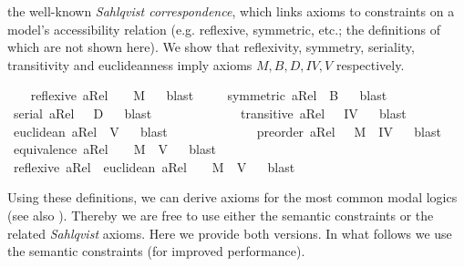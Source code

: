 \begin{isabellebody}
\begin{isamarkuptext}
  the well-known \emph{Sahlqvist correspondence}, which links axioms to constraints on a model's accessibility
  relation (e.g. reflexive, symmetric, etc.; the definitions of which are not shown here). We show
  that  reflexivity, symmetry, seriality, transitivity and euclideanness imply
  axioms $M, B, D, IV, V$ respectively.%
\end{isamarkuptext}\isamarkuptrue%
\ \ \isamarkupfalse%
\ {\isachardoublequoteopen}reflexive\ aRel\ \ {\isasymLongrightarrow}\ \ {\isasymlfloor}M{\isasymrfloor}{\isachardoublequoteclose}%
\ %
%
\isamarkupfalse%
\ blast\ %
%
%
%
\isanewline
\ \ \isamarkupfalse%
\ {\isachardoublequoteopen}symmetric\ aRel\ {\isasymLongrightarrow}\ {\isasymlfloor}B{\isasymrfloor}{\isachardoublequoteclose}%
\ %
%
\isamarkupfalse%
\ blast%
%
%
\isanewline
\ \ \isamarkupfalse%
\ {\isachardoublequoteopen}serial\ aRel\ \ {\isasymLongrightarrow}\ {\isasymlfloor}D{\isasymrfloor}{\isachardoublequoteclose}%
\ %
%
\isamarkupfalse%
\ blast%
%
%
\ \ \ \ \ \ \ \ \ \isanewline
\ \ \isamarkupfalse%
\ {\isachardoublequoteopen}transitive\ aRel\ \ {\isasymLongrightarrow}\ {\isasymlfloor}IV{\isasymrfloor}{\isachardoublequoteclose}%
\ %
%
\isamarkupfalse%
\ blast%
%
%
\ \ \ \isanewline
\ \ \isamarkupfalse%
\ {\isachardoublequoteopen}euclidean\ aRel\ {\isasymLongrightarrow}\ {\isasymlfloor}V{\isasymrfloor}{\isachardoublequoteclose}%
\ %
%
\isamarkupfalse%
\ blast%
%
%
\ \ \ \ \ \ \ \ \ \isanewline
\ \ \isamarkupfalse%
\ {\isachardoublequoteopen}preorder\ aRel\ {\isasymLongrightarrow}\ \ {\isasymlfloor}M{\isasymrfloor}\ {\isasymand}\ {\isasymlfloor}IV{\isasymrfloor}{\isachardoublequoteclose}%
\ %
%
\isamarkupfalse%
\ blast\ %
%
%
%
\isanewline
\ \ \isamarkupfalse%
\ {\isachardoublequoteopen}equivalence\ aRel\ \ {\isasymLongrightarrow}\ \ {\isasymlfloor}M{\isasymrfloor}\ {\isasymand}\ {\isasymlfloor}V{\isasymrfloor}{\isachardoublequoteclose}%
\ %
%
\isamarkupfalse%
\ blast\ %
%
%
%
\isanewline
\ \ \isamarkupfalse%
\ {\isachardoublequoteopen}reflexive\ aRel\ {\isasymand}\ euclidean\ aRel\ \ {\isasymLongrightarrow}\ \ {\isasymlfloor}M{\isasymrfloor}\ {\isasymand}\ {\isasymlfloor}V{\isasymrfloor}{\isachardoublequoteclose}%
\ %
%
\isamarkupfalse%
\ blast\ %
%
%
%
%
\begin{isamarkuptext}%
Using these definitions, we can derive axioms for the most common modal logics (see also \cite{C47}). 
  Thereby we are free to use either the semantic constraints or the related \emph{Sahlqvist} axioms. Here we provide 
  both versions. In what follows we use the semantic constraints (for improved performance).%
\end{isamarkuptext}\isamarkuptrue%
%
%
%
%
%
%
%
\end{isabellebody}%
